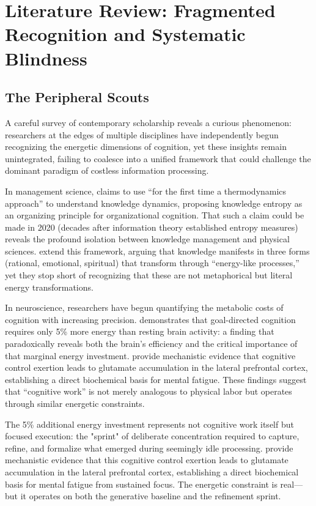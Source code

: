 \section{Literature Review: Fragmented Recognition and Systematic Blindness}

\subsection{The Peripheral Scouts}

A careful survey of contemporary scholarship reveals a curious phenomenon: researchers at the edges of multiple disciplines have independently begun recognizing the energetic dimensions of cognition, yet these insights remain unintegrated, failing to coalesce into a unified framework that could challenge the dominant paradigm of costless information processing.

In management science, \citet{bratianu2020} claims to use ``for the first time a thermodynamics approach'' to understand knowledge dynamics, proposing knowledge entropy as an organizing principle for organizational cognition. That such a claim could be made in 2020 (decades after information theory established entropy measures) reveals the profound isolation between knowledge management and physical sciences. \citet{bratianu2020b} extend this framework, arguing that knowledge manifests in three forms (rational, emotional, spiritual) that transform through ``energy-like processes,'' yet they stop short of recognizing that these are not metaphorical but literal energy transformations.

In neuroscience, researchers have begun quantifying the metabolic costs of cognition with increasing precision. \citet{jamadar2025} demonstrates that goal-directed cognition requires only 5\% more energy than resting brain activity: a finding that paradoxically reveals both the brain's efficiency and the critical importance of that marginal energy investment. \citet{wiehler2022} provide mechanistic evidence that cognitive control exertion leads to glutamate accumulation in the lateral prefrontal cortex, establishing a direct biochemical basis for mental fatigue. These findings suggest that ``cognitive work'' is not merely analogous to physical labor but operates through similar energetic constraints.

The 5\% additional energy investment represents not cognitive work itself but focused execution: the "sprint" of deliberate concentration required to capture, refine, and formalize what emerged during seemingly idle processing. \citet{wiehler2022} provide mechanistic evidence that this cognitive control exertion leads to glutamate accumulation in the lateral prefrontal cortex, establishing a direct biochemical basis for mental fatigue from sustained focus. The energetic constraint is real—but it operates on both the generative baseline and the refinement sprint.

